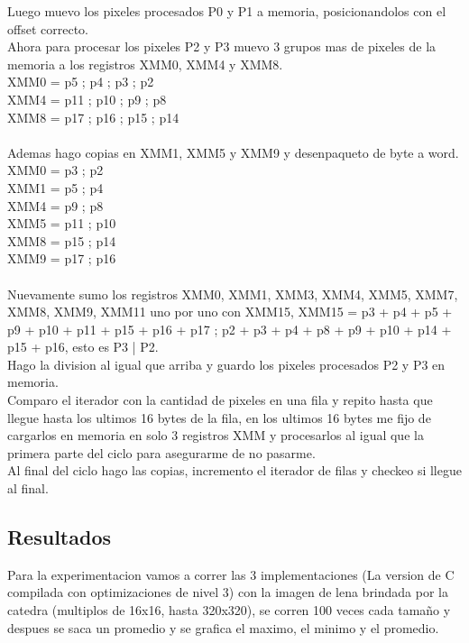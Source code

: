 Luego muevo los pixeles procesados P0 y P1 a memoria, posicionandolos con el offset correcto. \\

Ahora para procesar los pixeles P2 y P3 muevo 3 grupos mas de pixeles de la memoria a los registros XMM0, XMM4 y XMM8. \\
	XMM0 = p5 ; p4 ; p3 ; p2 \\
	XMM4 = p11 ; p10 ; p9 ; p8 \\
	XMM8 = p17 ; p16 ; p15 ; p14 \\
\\
Ademas hago copias en XMM1, XMM5 y XMM9 y desenpaqueto de byte a word. \\
	XMM0 = p3 ; p2 \\
 	XMM1 = p5 ; p4 \\
	XMM4 = p9 ; p8 \\
	XMM5 = p11 ; p10 \\
 	XMM8 = p15 ; p14 \\
	XMM9 = p17 ; p16 \\
\\
Nuevamente sumo los registros XMM0, XMM1, XMM3, XMM4, XMM5, XMM7, XMM8, XMM9, XMM11 uno por uno con XMM15, XMM15 = p3 + p4 + p5 + p9 + p10 + p11 + p15 + p16 + p17 ; p2 + p3 + p4 + p8 + p9 + p10 + p14 + p15 + p16, esto es P3 | P2. \\

Hago la division al igual que arriba y guardo los pixeles procesados P2 y P3 en memoria. \\

Comparo el iterador con la cantidad de pixeles en una fila y repito hasta que llegue hasta los ultimos 16 bytes de la fila, en los ultimos 16 bytes me fijo de cargarlos en memoria en solo 3 registros XMM y procesarlos al igual que la primera parte del ciclo para asegurarme de no pasarme. \\

Al final del ciclo hago las copias, incremento el iterador de filas y checkeo si llegue al final. \\

\subsection{Resultados}
Para la experimentacion vamos a correr las 3 implementaciones (La version de C compilada con optimizaciones de nivel 3) con la imagen de lena brindada por la catedra (multiplos de 16x16, hasta 320x320), se corren 100 veces cada tamaño y despues se saca un promedio y se grafica el maximo, el minimo y el promedio.


